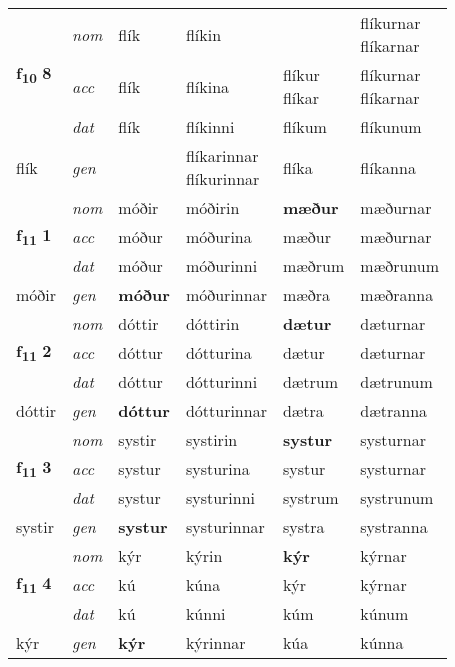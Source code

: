 \begin{longtable}[l]{X>{\footnotesize\itshape}XXXXX}
\multirow{3}{*}{{{\textbf{f{\textsubscript{10}}} \Large{\textbf{8}}}}} & nom & flík & flíkin & \textbf{\specialcell{flíkur\\ flíkar}} & \specialcell{flíkurnar\\ flíkarnar} \\*
 & acc & flík & flíkina & \specialcell{flíkur\\ flíkar} & \specialcell{flíkurnar\\ flíkarnar} \\*
 & dat & flík & flíkinni & flíkum & flíkunum \\*
 {\footnotesize{flík}} & gen & \textbf{\specialcell{flíkar\\ flíkur}} & \specialcell{flíkarinnar\\ flíkurinnar} & flíka & flíkanna \\
\cmidrule{1-6}

\multirow{3}{*}{{{\textbf{f{\textsubscript{11}}} \Large{\textbf{1}}}}} & nom & móðir & móðirin & \textbf{mæður} & mæðurnar \\*
 & acc & móður & móðurina & mæður & mæðurnar \\*
 & dat & móður & móðurinni & mæðrum & mæðrunum \\*
 {\footnotesize{móðir}} & gen & \textbf{móður} & móðurinnar & mæðra & mæðranna \\
\cmidrule{1-6}

\multirow{3}{*}{{{\textbf{f{\textsubscript{11}}} \Large{\textbf{2}}}}} & nom & dóttir & dóttirin & \textbf{dætur} & dæturnar \\*
 & acc & dóttur & dótturina & dætur & dæturnar \\*
 & dat & dóttur & dótturinni & dætrum & dætrunum \\*
 {\footnotesize{dóttir}} & gen & \textbf{dóttur} & dótturinnar & dætra & dætranna \\
\cmidrule{1-6}

\multirow{3}{*}{{{\textbf{f{\textsubscript{11}}} \Large{\textbf{3}}}}} & nom & systir & systirin & \textbf{systur} & systurnar \\*
 & acc & systur & systurina & systur & systurnar \\*
 & dat & systur & systurinni & systrum & systrunum \\*
 {\footnotesize{systir}} & gen & \textbf{systur} & systurinnar & systra & systranna \\
\cmidrule{1-6}

\multirow{3}{*}{{{\textbf{f{\textsubscript{11}}} \Large{\textbf{4}}}}} & nom & kýr & kýrin & \textbf{kýr} & kýrnar \\*
 & acc & kú & kúna & kýr & kýrnar \\*
 & dat & kú & kúnni & kúm & kúnum \\*
 {\footnotesize{kýr}} & gen & \textbf{kýr} & kýrinnar & kúa & kúnna \\
\cmidrule{1-6}


\end{longtable}
